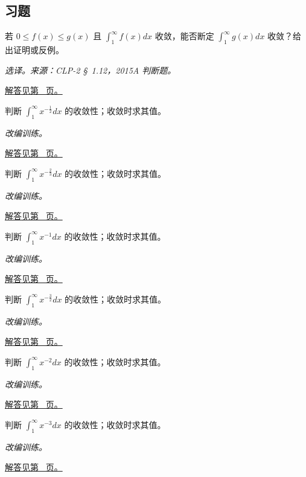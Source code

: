 \documentclass[12pt,fontset=fandol]{ctexart}
\begin{document}
\subsection{习题}
\begin{example}[比较判别的方向]\label{ex:c19q1}
若 $0\le f(x)\le g(x)$ 且 $\int_1^\infty f(x)dx$ 收敛，能否断定 $\int_1^\infty g(x)dx$ 收敛？给出证明或反例。
\par\textit{选译。来源：CLP-2 \S~1.12，2015A 判断题。}\par\hyperref[ans:c19q1]{解答见第~\pageref{ans:c19q1} 页。}
\end{example}
\begin{example}[无穷区间上的幂函数]\label{ex:c19q2}
判断 $\displaystyle\int_1^\infty x^{-\frac{1}{2}}dx$ 的收敛性；收敛时求其值。
\par\textit{改编训练。}\par\hyperref[ans:c19q2]{解答见第~\pageref{ans:c19q2} 页。}
\end{example}
\begin{example}[无穷区间上的幂函数]\label{ex:c19q3}
判断 $\displaystyle\int_1^\infty x^{-\frac{2}{3}}dx$ 的收敛性；收敛时求其值。
\par\textit{改编训练。}\par\hyperref[ans:c19q3]{解答见第~\pageref{ans:c19q3} 页。}
\end{example}
\begin{example}[无穷区间上的幂函数]\label{ex:c19q4}
判断 $\displaystyle\int_1^\infty x^{-1}dx$ 的收敛性；收敛时求其值。
\par\textit{改编训练。}\par\hyperref[ans:c19q4]{解答见第~\pageref{ans:c19q4} 页。}
\end{example}
\begin{example}[无穷区间上的幂函数]\label{ex:c19q5}
判断 $\displaystyle\int_1^\infty x^{-\frac{3}{2}}dx$ 的收敛性；收敛时求其值。
\par\textit{改编训练。}\par\hyperref[ans:c19q5]{解答见第~\pageref{ans:c19q5} 页。}
\end{example}
\begin{example}[无穷区间上的幂函数]\label{ex:c19q6}
判断 $\displaystyle\int_1^\infty x^{-2}dx$ 的收敛性；收敛时求其值。
\par\textit{改编训练。}\par\hyperref[ans:c19q6]{解答见第~\pageref{ans:c19q6} 页。}
\end{example}
\begin{example}[无穷区间上的幂函数]\label{ex:c19q7}
判断 $\displaystyle\int_1^\infty x^{-3}dx$ 的收敛性；收敛时求其值。
\par\textit{改编训练。}\par\hyperref[ans:c19q7]{解答见第~\pageref{ans:c19q7} 页。}
\end{example}
\end{document}
